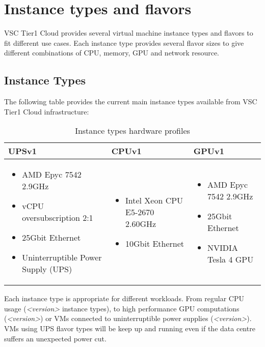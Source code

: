 \chapter{Instance types and flavors}

VSC Tier1 Cloud provides several virtual machine instance types and flavors to fit different use cases.
Each instance type provides several flavor sizes to give different combinations of CPU, memory, GPU and network resource.

\section{Instance Types}\label{sec:instance-types}
The following table provides the current main instance types available from VSC Tier1 Cloud infrastructure:

\begin{table}[h!]
\centering
\begin{tabular}{ |p{6cm}|p{4cm}|p{5cm}| }
  \hline
  \rowcolor{lightgray} \textbf{UPSv1} & \textbf{CPUv1} & \textbf{GPUv1} \\
  \hline
  \begin{itemize}
    \item AMD Epyc 7542 2.9GHz
    \item vCPU oversubscription 2:1
    \item 25Gbit Ethernet
    \item Uninterruptible Power Supply (UPS)
  \end{itemize}
  &
  \begin{itemize}
    \item Intel Xeon CPU E5-2670 2.60GHz
    \item 10Gbit Ethernet
  \end{itemize}
  &
  \begin{itemize}
    \item AMD Epyc 7542 2.9GHz
    \item 25Gbit Ethernet
    \item NVIDIA Tesla 4 GPU
  \end{itemize}
  \\
  \hline
\end{tabular}
\caption{Instance types hardware profiles}
\label{table:instance-type}
\end{table}

Each instance type is appropriate for different workloads. From regular CPU usage (\emph{<version>} instance types), to high performance GPU computations (\emph{<version>}) or VMs connected to uninterruptible power supplies (\emph{<version>}). VMs using UPS flavor types will be keep up and running even if the data centre suffers an unexpected power cut. 

